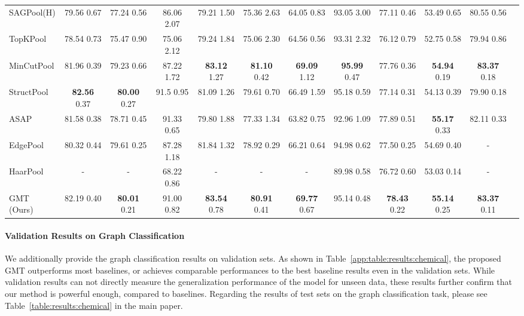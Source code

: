 \begin{table*}[t]
{\begin{tabular}{lccccccccccc}
SAGPool(H) & 79.56  0.67 & 77.24  0.56 & 86.06  2.07 & 79.21  1.50 & 75.36  2.63 & 64.05  0.83 & 93.05  3.00 & 77.11  0.46 & 53.49  0.65 & 80.55  0.56 \\
TopKPool   & 78.54  0.73 & 75.47  0.90 & 75.06  2.12 & 79.24  1.84 & 75.06  2.30 & 64.56  0.56 & 93.31  2.32 & 76.12  0.79 & 52.75  0.58 & 79.94  0.86 \\
MinCutPool & 81.96  0.39 & 79.23  0.66 & 87.22  1.72 & \textbf{83.12}  1.27 & \textbf{81.10}  0.42 & \textbf{69.09}  1.12 & \textbf{95.99}  0.47 & 77.76  0.36 & \textbf{54.94}  0.19 & \textbf{83.37}  0.18 \\
StructPool & \textbf{82.56}  0.37 & \textbf{80.00}  0.27 & 91.5  0.95 & 81.09  1.26 & 79.61  0.70 & 66.49  1.59 & 95.18  0.59 & 77.14  0.31 & 54.13   0.39 & 79.90  0.18 \\
ASAP       & 81.58  0.38 & 78.71  0.45 & 91.33 0.65 &  79.80  1.88  & 77.33  1.34 & 63.82  0.75 & 92.96  1.09 & 77.89  0.51 & \textbf{55.17}   0.33 & 82.11  0.33 \\
EdgePool   & 80.32  0.44 & 79.61  0.25 & 87.28 1.18 & 81.84  1.32 & 78.92  0.29 & 66.21  0.64 & 94.98  0.62 & 77.50  0.25 & 54.69   0.40 &         -        \\
HaarPool   &         -        & - & 68.22 0.86 &         -        &         -        &         -        & 89.98  0.58 & 76.72  0.60 & 53.03   0.14 &         -        \\
\midrule
GMT (Ours) & 82.19  0.40 & \textbf{80.01}  0.21 & 91.00  0.82 & \textbf{83.54}  0.78 & \textbf{80.91}  0.41 & \textbf{69.77}  0.67 & 95.14  0.48 & \textbf{78.43}  0.22 & \textbf{55.14}  0.25 & \textbf{83.37}  0.11 \\
\bottomrule
\end{tabular}
}
\vspace{-0.15in}
\label{app:table:results:chemical}
\end{table*} 
\paragraph{Validation Results on Graph Classification}
We additionally provide the graph classification results on validation sets. As shown in Table~\ref{app:table:results:chemical}, the proposed GMT outperforms most baselines, or achieves comparable performances to the best baseline results even in the validation sets. While validation results can not directly measure the generalization performance of the model for unseen data, these results further confirm that our method is powerful enough, compared to baselines. Regarding the results of test sets on the graph classification task, please see Table~\ref{table:results:chemical} in the main paper.


